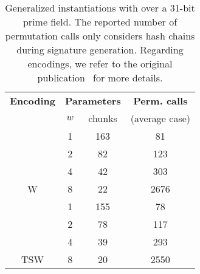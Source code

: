 
\renewcommand\arraystretch{1.25}
\begin{table}[h]
	\centering
	\begin{tabular}{cccc}
		\toprule
    		\textbf{Encoding} & \multicolumn{2}{c}{\textbf{Parameters}}  & \textbf{Perm. calls} \\
    		 & {$w$} & chunks  & (average case)   \\
    		\midrule
	     &  1 & 163 & 81    \\
	     &  2 & 82  & 123 \\
	     &  4 & 42  & 303 \\
	 \multirow{-4}{*}{W}  & 8 & 22 & 2676 \\
	 \midrule
 	   &  1 & 155 &  78   \\
	   &  2 & 78  &  117  \\
	   &  4 & 39  &  293  \\
	 \multirow{-4}{*}{TSW}  &  8 & 20 & 2550  \\
	\hline
	\end{tabular}
	\caption{Generalized \XMSS instantiations with \PoseidonTwo over a 31-bit prime field. The reported number of permutation calls only considers hash chains during signature generation. Regarding encodings, we refer to the original publication~\cite{cryptoeprint:2025/055} for more details.\label{tab:xmss_poseidon2_permcalls}}
\end{table}



